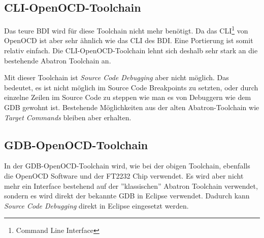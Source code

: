 \subsection{CLI-OpenOCD-Toolchain}
Das teure BDI wird für diese Toolchain nicht mehr benötigt.
Da das CLI\footnote{Command Line Interface} von OpenOCD ist aber sehr ähnlich wie das CLI des BDI.
Eine Portierung ist somit relativ einfach.
Die CLI-OpenOCD-Toolchain lehnt sich deshalb sehr stark an die bestehende Abatron Toolchain an.

Mit dieser Toolchain ist \textit{Source Code Debugging} aber nicht möglich.
Das bedeutet, es ist nicht möglich im Source Code Breakpoints zu setzten, oder durch einzelne Zeilen im Source Code zu steppen wie man es von Debuggern wie dem GDB gewohnt ist.
Bestehende Möglichkeiten aus der alten Abatron-Toolchain wie \textit{Target Commands} bleiben aber erhalten.


\subsection{GDB-OpenOCD-Toolchain}
In der GDB-OpenOCD-Toolchain wird, wie bei der obigen Toolchain, ebenfalls die OpenOCD Software und der FT2232 Chip verwendet.
Es wird aber nicht mehr ein Interface bestehend auf der ''klassischen'' Abatron Toolchain verwendet, sondern es wird direkt der bekannte GDB in Eclipse verwendet.
Dadurch kann \textit{Source Code Debugging} direkt in Eclipse eingesetzt werden.

